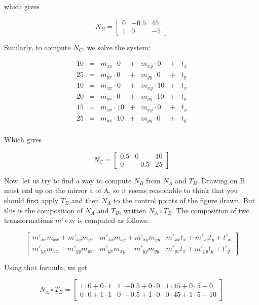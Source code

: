 which gives

\[ N_B = \left[ \begin{array}{ccc}
0 & -0.5 & 45\\
1 & 0 & -5 
\end{array} \right] \]

Similarly, to compute $N_C$, we solve the system:

\[ \begin{array}{ccccccc}
10 & = & m_{xx} \cdot 0 & + & m_{xy} \cdot 0 & + & t_x \\
25 & = & m_{yx} \cdot 0 & + & m_{yy} \cdot 0 & + & t_y \\
10 & = & m_{xx} \cdot 0 & + & m_{xy} \cdot 10 & + & t_x \\
20 & = & m_{yx} \cdot 0 & + & m_{yy} \cdot 10 & + & t_y \\
15 & = & m_{xx} \cdot 10 & + & m_{xy} \cdot 0 & + & t_x \\
25 & = & m_{yx} \cdot 10 & + & m_{yy} \cdot 0 & + & t_y \\
\end{array} \]

Which gives

\[ N_C = \left[ \begin{array}{ccc}
0.5 & 0 & 10\\
0 & -0.5 & 25 
\end{array} \right] \]

Now, let us try to find a way to compute $N_B$ from $N_A$ and $T_B$.
Drawing on B must end up on the mirror a of A, so it seems reasonable
to think that you should first apply $T_B$ and then $N_A$ to the
control points of the figure drawn.  But this is the composition of
$N_A$ and $T_B$, written $N_A \circ T_B$.  The composition of two
transformations $m' \circ m$ is computed as follows:

\[ \left[ \begin{array}{ccc}
{m'}_{xx} m_{xx} + {m'}_{xy} m_{yx} & {m'}_{xx} m_{xy} + {m'}_{xy}
m_{yy} & {m'}_{xx} t_x + {m'}_{xy} t_y + {t'}_x\\
{m'}_{yx} m_{xx} + {m'}_{yy} m_{yx} & {m'}_{yx} m_{xy} + {m'}_{yy}
m_{yy} & {m'}_{yx} t_x + {m'}_{yy} t_y + {t'}_y
\end{array} \right] \]

Using that formula, we get

\[ N_A \circ T_B = \left[ \begin{array}{ccc}
1 \cdot 0 + 0 \cdot 1 & 1 \cdot -0.5 + 0
\cdot 0 & 1 \cdot 45 + 0 \cdot 5 + 0\\
0 \cdot 0 + 1 \cdot 1 & 0 \cdot -0.5 + 1
\cdot 0 & 0 \cdot 45 + 1 \cdot 5 - 10
\end{array} \right] \]


